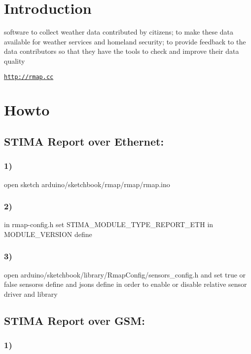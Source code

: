 \hypertarget{index_introduction}{}\section{Introduction}\label{index_introduction}
software to collect weather data contributed by citizens; to make these data available for weather services and homeland security; to provide feedback to the data contributors so that they have the tools to check and improve their data quality

\href{http://rmap.cc}{\tt http\+://rmap.\+cc}\hypertarget{index_howto}{}\section{Howto}\label{index_howto}
\hypertarget{index_report_eth}{}\subsection{S\+T\+I\+M\+A Report over Ethernet\+:}\label{index_report_eth}
\hypertarget{index_report_eth_1}{}\subsubsection{1)}\label{index_report_eth_1}
open sketch arduino/sketchbook/rmap/rmap/rmap.\+ino\hypertarget{index_report_eth_2}{}\subsubsection{2)}\label{index_report_eth_2}
in rmap-\/config.\+h set S\+T\+I\+M\+A\+\_\+\+M\+O\+D\+U\+L\+E\+\_\+\+T\+Y\+P\+E\+\_\+\+R\+E\+P\+O\+R\+T\+\_\+\+E\+TH in M\+O\+D\+U\+L\+E\+\_\+\+V\+E\+R\+S\+I\+ON define\hypertarget{index_report_eth_3}{}\subsubsection{3)}\label{index_report_eth_3}
open arduino/sketchbook/library/\+Rmap\+Config/sensors\+\_\+config.\+h and set true or false sensors\textquotesingle{}s define and json\textquotesingle{}s define in order to enable or disable relative sensor driver and library\hypertarget{index_report_gsm}{}\subsection{S\+T\+I\+M\+A Report over G\+S\+M\+:}\label{index_report_gsm}
\hypertarget{index_report_gsm_1}{}\subsubsection{1)}\label{index_report_gsm_1}
